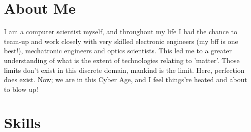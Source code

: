 \documentclass[11pt,a4paper,helvet]{moderncv}
\begin{document}

\newpage

\section{About Me}	
I am a computer scientist myself, and throughout my life I had the chance to team-up and work closely with very skilled electronic engineers (my bff is one best!), mechatronic engineers and optics scientists. This led me to a greater understanding of what is the extent of technologies relating to 'matter'. Those limits don't exist in this discrete domain, mankind is the limit. Here, perfection does exist.
\newline
\newline
Now; we are in this Cyber Age, and I feel things're heated and about to blow up!
\section{Skills}
\end{document}
